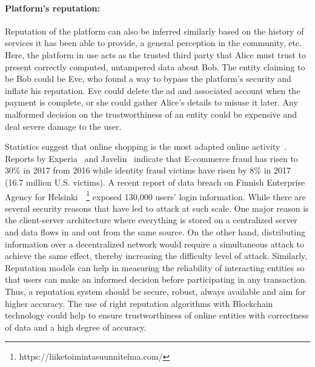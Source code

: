 \paragraph{Platform's reputation:}Reputation of the platform can also be
inferred similarly based on the history of services it has been able to
provide, a general perception in the community, etc.  Here, the platform in use
acts as the trusted third party that Alice must trust to present correctly
computed, untampered data about Bob. The entity claiming to be Bob could be
Eve, who found a way to bypass the platform's security and inflate his
reputation.  Eve could delete the ad and associated account when the payment is
complete, or she could gather Alice's details to misuse it later.  Any
malformed decision on the trustworthiness of an entity could be expensive and
deal severe damage to the user. \par 
Statistics suggest that online shopping is the most adapted online
activity~\cite{experian}. Reports by Experia~\cite{experian} and
Javelin~\cite{javelin} indicate that E-commerce fraud has risen to 30\% in 2017
from 2016 while identity fraud victims have risen by 8\% in 2017 (16.7 million
U.S. victims). 
A recent report of data breach on Finnish Enterprise Agency for
Helsinki~\cite{finland}~\footnote{https://liiketoimintasuunnitelma.com/}
exposed 130,000 users' login information.
While there are several security reasons that have led to attack at such scale.
One major reason is the client-server architecture where everything is stored
on a centralized server and data flows in and out from the same source. On the
other hand, distributing information over a decentralized network would require
a simultaneous attack to achieve the same effect, thereby increasing the
difficulty level of attack. Similarly, Reputation models can help in measuring
the reliability of interacting entities so that users can make an informed
decision before participating in any transaction. Thus, a reputation system
should be secure, robust, always available and aim for higher accuracy. The use
of right reputation algorithms with Blockchain technology could help to ensure
trustworthiness of online entities with correctness of data and a high degree
of accuracy.  
